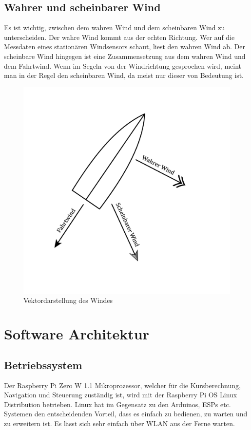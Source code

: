 \subsection{Wahrer und scheinbarer Wind}
Es ist wichtig, zwischen dem wahren Wind und dem scheinbaren Wind zu unterscheiden. Der wahre Wind kommt aus der echten Richtung. Wer auf die Messdaten eines stationären Windsensors schaut, liest den wahren Wind ab. Der scheinbare Wind hingegen ist eine Zusammensetzung aus dem wahren Wind und dem Fahrtwind. Wenn im Segeln von der Windrichtung gesprochen wird, meint man in der Regel den scheinbaren Wind, da meist nur dieser von Bedeutung ist.
\begin{figure}
    \centering
    \includegraphics[width=0.75\linewidth]{assets/scheinbarerwind.png}
    \caption{Vektordarstellung des Windes}
    
\end{figure}

\section{Software Architektur}
\subsection*{Betriebssystem}
Der Raspberry Pi Zero W 1.1 Mikroprozessor, welcher für die Kursberechnung, Navigation und Steuerung zuständig ist, wird mit der Raspberry Pi OS Linux Distribution betrieben. Linux hat im Gegensatz zu den Arduinos, ESPs etc. Systemen den entscheidenden Vorteil, dass es einfach zu bedienen, zu warten und zu erweitern ist. Es lässt sich sehr einfach über WLAN aus der Ferne warten.
